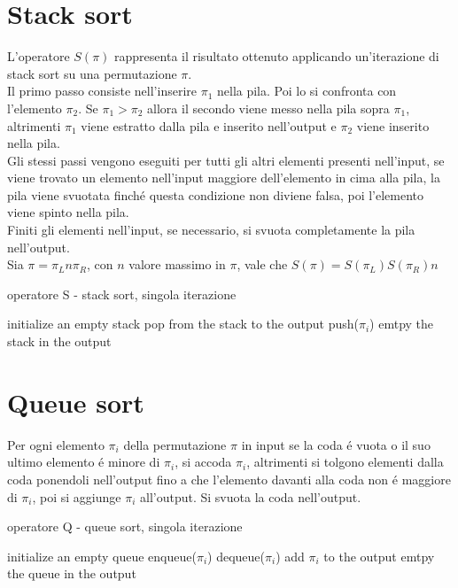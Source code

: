 \section*{Stack sort}
L'operatore $S(\pi)$ rappresenta il risultato ottenuto applicando un'iterazione di stack sort su una permutazione $\pi$.\\
Il primo passo consiste nell'inserire $\pi_1$ nella pila. Poi lo si confronta con l'elemento $\pi_2$. Se $\pi_1>\pi_2$ allora il secondo viene messo nella pila sopra $\pi_1$, altrimenti $\pi_1$ viene estratto dalla pila e inserito nell'output e $\pi_2$ viene inserito nella pila.\\
Gli stessi passi vengono eseguiti per tutti gli altri elementi presenti nell'input, se viene trovato un elemento nell'input maggiore dell'elemento in cima alla pila, la pila viene svuotata finch\'e questa condizione non diviene falsa, poi l'elemento viene spinto nella pila.\\
Finiti gli elementi nell'input, se necessario, si svuota completamente la pila nell'output.\\
Sia $\pi = \pi_Ln\pi_R$, con $n$ valore massimo in $\pi$, vale che $S(\pi)=S(\pi_L)S(\pi_R)n$
\begin{algorithm}[H]
   \caption{operatore S - stack sort, singola iterazione}
\begin{algorithmic}[1]
\State initialize an empty stack
   \State pop from the stack to the output
   \EndWhile
   \State push($\pi_i$)
   \EndFor
   \State emtpy the stack in the output
\end{algorithmic}
\end{algorithm}
\section*{Queue sort}
Per ogni elemento $\pi_i$ della permutazione $\pi$ in input se la coda \'e vuota o il suo ultimo elemento \'e minore di $\pi_i$, si accoda $\pi_i$, altrimenti si tolgono elementi dalla coda ponendoli nell'output fino a che l'elemento davanti  alla coda non \'e maggiore di $\pi_i$, poi si aggiunge $\pi_i$ all'output.
Si svuota la coda nell'output. 
\begin{algorithm}[H]
   \caption{operatore Q - queue sort, singola iterazione}
\begin{algorithmic}[1]
\State initialize an empty queue
\State enqueue($\pi_i$)
\Else
{}
\State dequeue($\pi_i$)
\EndWhile
\State add $\pi_i$ to the output
\EndIf
\EndFor
\State emtpy the queue in the output
\end{algorithmic}
\end{algorithm}
